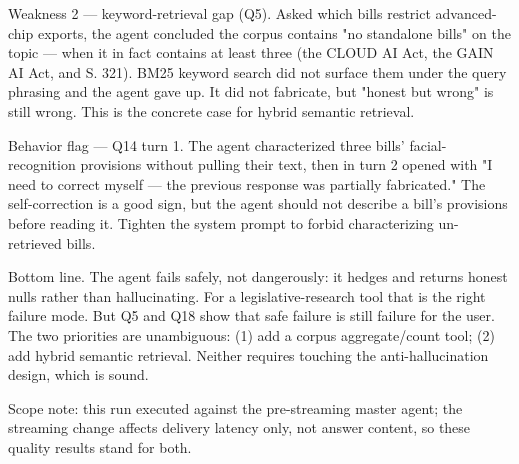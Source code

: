 \documentclass[11pt]{article}
\begin{document}
Weakness 2 --- keyword-retrieval gap (Q5). Asked which bills restrict advanced-chip exports, the agent concluded the corpus contains "no standalone bills" on the topic --- when it in fact contains at least three (the CLOUD AI Act, the GAIN AI Act, and S. 321). BM25 keyword search did not surface them under the query phrasing and the agent gave up. It did not fabricate, but "honest but wrong" is still wrong. This is the concrete case for hybrid semantic retrieval.

Behavior flag --- Q14 turn 1. The agent characterized three bills' facial-recognition provisions without pulling their text, then in turn 2 opened with "I need to correct myself --- the previous response was partially fabricated." The self-correction is a good sign, but the agent should not describe a bill's provisions before reading it. Tighten the system prompt to forbid characterizing un-retrieved bills.

Bottom line. The agent fails safely, not dangerously: it hedges and returns honest nulls rather than hallucinating. For a legislative-research tool that is the right failure mode. But Q5 and Q18 show that safe failure is still failure for the user. The two priorities are unambiguous: (1) add a corpus aggregate/count tool; (2) add hybrid semantic retrieval. Neither requires touching the anti-hallucination design, which is sound.

Scope note: this run executed against the pre-streaming master agent; the streaming change affects delivery latency only, not answer content, so these quality results stand for both.
\end{document}
